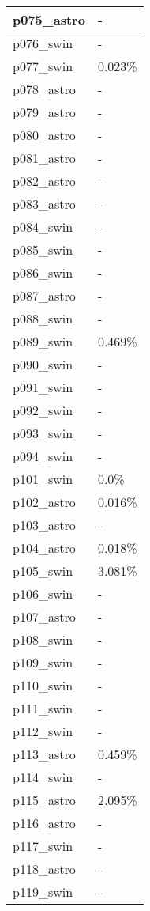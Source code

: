 \documentclass{article}%
\begin{document}
\begin{longtabu}{X[l] X[r]}
\hline%
p075\_astro&{-}\\%
\hline%
p076\_swin&{-}\\%
\hline%
p077\_swin&0.023\%\\%
\hline%
p078\_astro&{-}\\%
\hline%
p079\_astro&{-}\\%
\hline%
p080\_astro&{-}\\%
\hline%
p081\_astro&{-}\\%
\hline%
p082\_astro&{-}\\%
\hline%
p083\_astro&{-}\\%
\hline%
p084\_swin&{-}\\%
\hline%
p085\_swin&{-}\\%
\hline%
p086\_swin&{-}\\%
\hline%
p087\_astro&{-}\\%
\hline%
p088\_swin&{-}\\%
\hline%
p089\_swin&0.469\%\\%
\hline%
p090\_swin&{-}\\%
\hline%
p091\_swin&{-}\\%
\hline%
p092\_swin&{-}\\%
\hline%
p093\_swin&{-}\\%
\hline%
p094\_swin&{-}\\%
\hline%
p101\_swin&0.0\%\\%
\hline%
p102\_astro&0.016\%\\%
\hline%
p103\_astro&{-}\\%
\hline%
p104\_astro&0.018\%\\%
\hline%
p105\_swin&3.081\%\\%
\hline%
p106\_swin&{-}\\%
\hline%
p107\_astro&{-}\\%
\hline%
p108\_swin&{-}\\%
\hline%
p109\_swin&{-}\\%
\hline%
p110\_swin&{-}\\%
\hline%
p111\_swin&{-}\\%
\hline%
p112\_swin&{-}\\%
\hline%
p113\_astro&0.459\%\\%
\hline%
p114\_swin&{-}\\%
\hline%
p115\_astro&2.095\%\\%
\hline%
p116\_astro&{-}\\%
\hline%
p117\_swin&{-}\\%
\hline%
p118\_astro&{-}\\%
\hline%
p119\_swin&{-}\\%

\end{longtabu}
\end{document}
